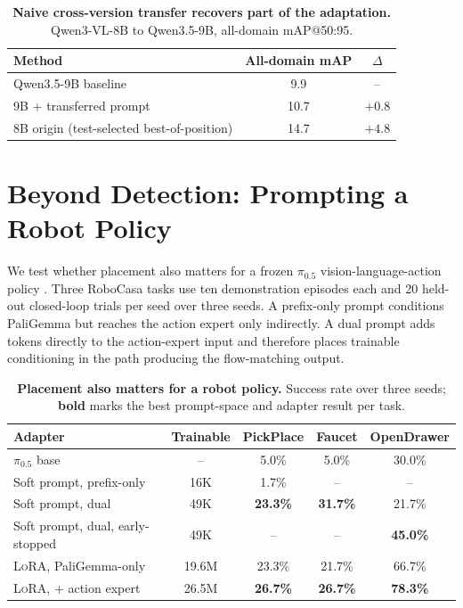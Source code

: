 \documentclass{article}
\newcommand{\lora}{\textsc{LoRA}}
\newcommand{\qwen}{Qwen3-VL}
\newcommand{\best}[1]{\textbf{#1}}
\begin{document}
\begin{table}[h]
  \centering
  \caption{\textbf{Naive cross-version transfer recovers part of the
  adaptation.} \qwen{}-8B to Qwen3.5-9B, all-domain mAP@50:95.}
  \label{tab:transfer}
  \small
  \begin{tabular}{lcc}
    \toprule
    Method & All-domain mAP & $\Delta$ \\
    \midrule
    Qwen3.5-9B baseline & 9.9 & -- \\
    9B + transferred prompt & 10.7 & $+0.8$ \\
    8B origin (test-selected best-of-position) & 14.7 & $+4.8$ \\
    \bottomrule
  \end{tabular}
\end{table}

\section{Beyond Detection: Prompting a Robot Policy}
\label{app:robotics}
\label{sec:robotics}

We test whether placement also matters for a frozen
$\pi_{0.5}$ vision-language-action policy
\citep{black2024pi0,intelligence2025pi05}.
Three RoboCasa tasks \citep{nasiriany2024robocasa} use ten demonstration
episodes each and 20 held-out closed-loop trials per seed over three seeds.
A prefix-only prompt conditions PaliGemma but reaches the action expert only
indirectly.
A dual prompt adds tokens directly to the action-expert input and therefore
places trainable conditioning in the path producing the flow-matching output.

\begin{table}[h]
  \centering
  \caption{\textbf{Placement also matters for a robot policy.}
  Success rate over three seeds; \best{bold} marks the best prompt-space and
  adapter result per task.}
  \label{tab:robocasa}
  \small
  \setlength{\tabcolsep}{5pt}
  \begin{tabular}{lcccc}
    \toprule
    Adapter & Trainable & PickPlace & Faucet & OpenDrawer \\
    \midrule
    $\pi_{0.5}$ base & -- & 5.0\% & 5.0\% & 30.0\% \\
    \midrule
    Soft prompt, prefix-only & 16K & 1.7\% & -- & -- \\
    Soft prompt, dual & 49K & \best{23.3\%} & \best{31.7\%} & 21.7\% \\
    Soft prompt, dual, early-stopped & 49K & -- & -- & \best{45.0\%} \\
    \midrule
    \lora{}, PaliGemma-only & 19.6M & 23.3\% & 21.7\% & 66.7\% \\
    \lora{}, + action expert & 26.5M & \best{26.7\%} & \best{26.7\%} & \best{78.3\%} \\
    \bottomrule
  \end{tabular}
\end{table}
\end{document}
